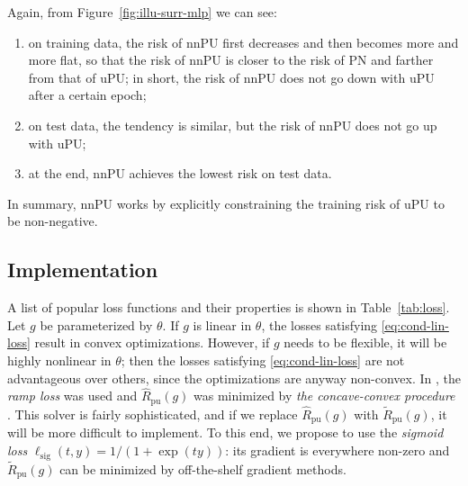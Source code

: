 \documentclass{article}
\newcommand{\hRpu}{\widehat{R}_\mathrm{pu}}
\newcommand{\tRpu}{\widetilde{R}_\mathrm{pu}}
\newcommand{\ellsig}{\ell_\mathrm{sig}}
\begin{document}
Again, from Figure~\ref{fig:illu-surr-mlp} we can see:
\begin{enumerate}[label=(\Alph*)]
  \vspace{-1ex}%
  \item on training data, the risk of nnPU first decreases and then becomes more and more flat, so that the risk of nnPU is closer to the risk of PN and farther from that of uPU; in short, the risk of nnPU does not go down with uPU after a certain epoch;
  \item on test data, the tendency is similar, but the risk of nnPU does not go up with uPU;
  \item at the end, nnPU achieves the lowest risk on test data.
  \vspace{-1ex}%
\end{enumerate}
In summary, nnPU works by explicitly constraining the training risk of uPU to be non-negative.

\subsection{Implementation}%
\label{sec:implementation}%

A list of popular loss functions and their properties is shown in Table~\ref{tab:loss}. Let $g$ be parameterized by $\theta$. If $g$ is linear in $\theta$, the losses satisfying \eqref{eq:cond-lin-loss} result in convex optimizations. However, if $g$ needs to be flexible, it will be highly nonlinear in $\theta$; then the losses satisfying \eqref{eq:cond-lin-loss} are not advantageous over others, since the optimizations are anyway non-convex. In \cite{christo14nips}, the \emph{ramp loss} was used and $\hRpu(g)$ was minimized by \emph{the concave-convex procedure} \citep{yuille01nips}. This solver is fairly sophisticated, and if we replace $\hRpu(g)$ with $\tRpu(g)$, it will be more difficult to implement. To this end, we propose to use the \emph{sigmoid loss} $\ellsig(t,y)=1/(1+\exp(ty))$: its gradient is everywhere non-zero and $\tRpu(g)$ can be minimized by off-the-shelf gradient methods.
\end{document}
